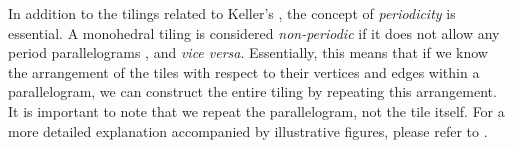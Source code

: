 \documentclass[../thesis.tex]{subfiles}
\begin{document}

In addition to the tilings related to Keller's , the concept of \emph{periodicity} is essential. A monohedral tiling is considered \emph{non-periodic} if it does not allow any period parallelograms \cite{penrosePentaplexityClassNonPeriodic1979}, and \emph{vice versa}. Essentially, this means that if we know the arrangement of the tiles with respect to their vertices and edges within a parallelogram, we can construct the entire tiling by repeating this arrangement. It is important to note that we repeat the parallelogram, not the tile itself. For a more detailed explanation accompanied by illustrative figures, please refer to \cite[p.29-30,147-149]{grunbaumTilingsPatterns1987}. 
\end{document}
